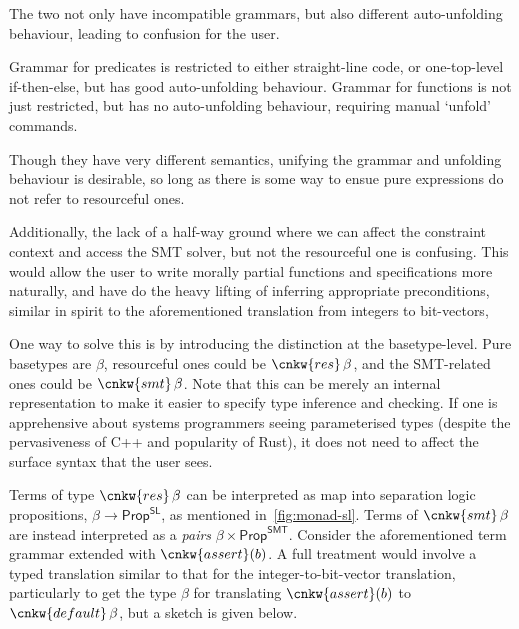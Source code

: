 The two not only have incompatible grammars, but also different auto-unfolding
behaviour, leading to confusion for the user.

Grammar for predicates is restricted to either straight-line code, or
one-top-level if-then-else, but has good auto-unfolding behaviour. Grammar for
functions is not just restricted, but has no auto-unfolding behaviour,
requiring manual `unfold' commands.

Though they have very different semantics, unifying the grammar and unfolding
behaviour is desirable, so long as there is some way to ensue pure expressions
do not refer to resourceful ones.

Additionally, the lack of a half-way ground where we can affect the constraint
context and access the SMT solver, but not the resourceful one is confusing.
This would allow the user to write morally partial functions and specifications
more naturally, and have  do the heavy lifting of inferring appropriate
preconditions, similar in spirit to the aforementioned translation from
integers to bit-vectors,

One way to solve this is by introducing the distinction at the basetype-level.
Pure basetypes are $\beta$, resourceful ones could be $\cnkw{res}\,\beta$, and
the SMT-related ones could be $\cnkw{smt}\,\beta$. Note that this can be merely
an internal representation to make it easier to specify type inference and
checking. If one is apprehensive about systems programmers seeing parameterised
types (despite the pervasiveness of C++ and popularity of Rust), it does not
need to affect the surface syntax that the user sees.

Terms of type $\cnkw{res}\,\beta$ can be interpreted as map into separation
logic propositions, $\beta \rightarrow \mathsf{Prop}^\mathsf{SL}$, as mentioned
in~\cref{fig:monad-sl}. Terms of $\cnkw{smt}\,\beta$ are instead interpreted as
a \emph{pairs} $\beta \times \mathsf{Prop}^\mathsf{SMT}$. Consider the
aforementioned term grammar extended with $\cnkw{assert}(b)$. A full treatment
would involve a typed translation similar to that for the integer-to-bit-vector
translation, particularly to get the type $\beta$ for translating
$\cnkw{assert}(b)$ to $\cnkw{default}\,\beta$, but a sketch is given below.

